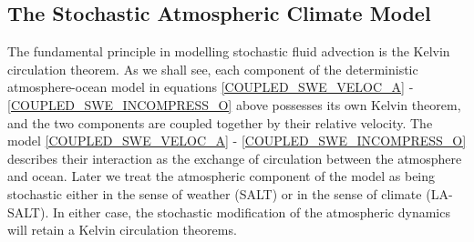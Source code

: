 \documentclass[11pt, oneside]{article}   	%
\numberwithin{equation}{section}
\theoremstyle{plain}
\theoremstyle{definition}
\theoremstyle{remark}
\newcommand{\<}{\langle}
\renewcommand{\>}{\rangle}
\begin{document}

 \subsection{The Stochastic Atmospheric Climate Model}\label{subsect_StochModel}





The fundamental principle in modelling stochastic fluid advection is the Kelvin circulation theorem. As we shall see, each component of the deterministic atmosphere-ocean model in equations \eqref{COUPLED_SWE_VELOC_A} - \eqref{COUPLED_SWE_INCOMPRESS_O} above possesses its own Kelvin theorem, and the two components are coupled together by their relative velocity. The model \eqref{COUPLED_SWE_VELOC_A} - \eqref{COUPLED_SWE_INCOMPRESS_O} describes their interaction as the exchange of circulation between the atmosphere and ocean. Later we treat the atmospheric component of the model as being stochastic either in the sense of weather (SALT) or in the sense of climate (LA-SALT). In either case, the stochastic modification of the atmospheric dynamics will retain a Kelvin circulation theorems.
\end{document}
